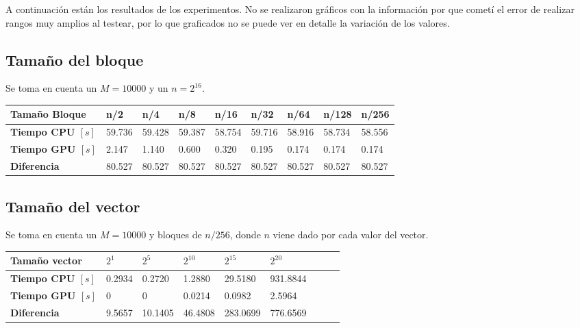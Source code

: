A continuación están los resultados de los experimentos.
No se realizaron gráficos con la información por que
cometí el error de realizar rangos muy amplios al testear,
por lo que graficados no se puede ver en detalle la variación
de los valores.

\subsection{Tamaño del bloque}

Se toma en cuenta un $M=10000$ y un $n=2^{16}$.

\begin{center}
	\begin{tabular}{|l|l|l|l|l|l|l|l|l|}
		\hline
		\textbf{Tamaño Bloque} & \textbf{n/2} & \textbf{n/4} & \textbf{n/8} & \textbf{n/16} & \textbf{n/32} & \textbf{n/64} & \textbf{n/128} & \textbf{n/256} \\\hline
		\textbf{Tiempo CPU $[s]$} 							 & 59.736 & 59.428 & 59.387 & 58.754 & 59.716 & 58.916 & 58.734 & 58.556\\\hline 
		\textbf{Tiempo GPU $[s]$} 							 &  2.147 &  1.140 &  0.600 &  0.320 &  0.195 &  0.174 &  0.174 &  0.174\\\hline 
		\textbf{Diferencia} 							 & 80.527 & 80.527 & 80.527 & 80.527 & 80.527 & 80.527 & 80.527 & 80.527\\\hline 
	\end{tabular}
\end{center}

\subsection{Tamaño del vector}

Se toma en cuenta un $M=10000$ y bloques de $n/256$,
donde $n$ viene dado por cada valor del vector.

\begin{center}
	\begin{tabular}{|l|l|l|l|l|l|l|l|l|}
		\hline
		\textbf{Tamaño vector} & \textbf{$2^{1}$} & \textbf{$2^{5}$} & \textbf{$2^{10}$} & \textbf{$2^{15}$} & \textbf{$2^{20}$} \\\hline
		\textbf{Tiempo CPU $[s]$} &  0.2934 &   0.2720 &  1.2880 &  29.5180 & 931.8844 \\\hline 
		\textbf{Tiempo GPU $[s]$} &  0      &   0      &  0.0214 &   0.0982 &   2.5964 \\\hline
		\textbf{Diferencia} &  9.5657 &  10.1405 & 46.4808 & 283.0699 & 776.6569 \\\hline
	\end{tabular}
\end{center}

